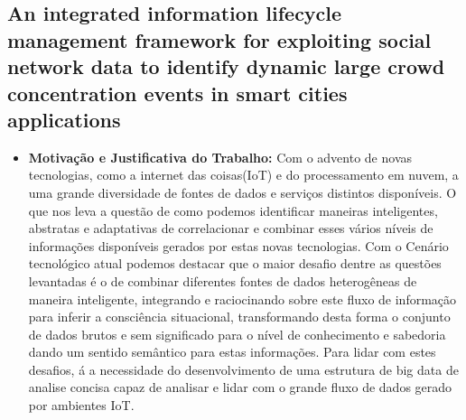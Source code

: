 \documentclass[tid,table]{texufpel} %
\begin{document}
\subsection{An integrated information lifecycle management framework for exploiting social network data to identify dynamic large crowd concentration events in smart cities applications}

\begin{itemize}
	\item \textbf{Motivação e Justificativa do Trabalho:} Com o advento de novas tecnologias, como a internet das coisas(IoT) e do processamento em nuvem, a uma grande diversidade de fontes de dados e serviços distintos disponíveis. O que nos leva a questão de como podemos identificar maneiras inteligentes, abstratas e adaptativas de correlacionar e combinar esses vários níveis de informações disponíveis gerados por estas novas tecnologias. Com o Cenário tecnológico atual podemos destacar que o maior desafio dentre as questões levantadas é o de combinar diferentes fontes de dados heterogêneas de maneira inteligente, integrando e raciocinando sobre este fluxo de informação para inferir a consciência situacional, transformando desta forma o conjunto de dados brutos e sem significado para o nível de conhecimento e sabedoria dando um sentido semântico para estas informações. Para lidar com estes desafios, á a necessidade do desenvolvimento de uma estrutura de big data de analise concisa capaz de analisar e lidar com o grande fluxo de dados gerado por ambientes IoT.	
	

\end{itemize}
\end{document}
